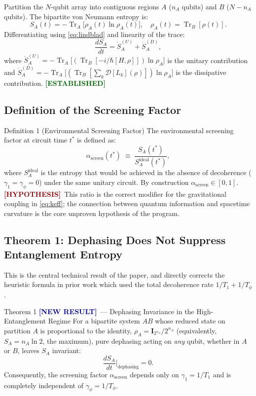 \documentclass[12pt,a4paper]{article}
\newcommand{\EST}{\textcolor{darkgreen}{\textbf{[ESTABLISHED]}}}
\newcommand{\HYP}{\textcolor{darkred}{\textbf{[HYPOTHESIS]}}}
\newcommand{\NEW}{\textcolor{darkblue}{\textbf{[NEW RESULT]}}}
\theoremstyle{monette}
\theoremstyle{definition}
\newcommand{\SA}{S_A}
\newcommand{\asc}{\alpha_{\mathrm{screen}}}
\newcommand{\gamone}{\gamma_1}
\newcommand{\gamphi}{\gamma_\phi}
\newcommand{\Tone}{T_1}
\newcommand{\Tphi}{T_\phi}
\newcommand{\rhored}{\rho_A}
\newcommand{\Diss}{\mathcal{D}}
\renewcommand{\Tr}{\operatorname{Tr}}
\begin{document}
Partition the $N$-qubit array into contiguous regions $A$ ($n_A$ qubits)
and $B$ ($N-n_A$ qubits). The bipartite von Neumann entropy is:
\begin{equation}
  \SA(t) = -\Tr_A\bigl[\rhored(t)\ln\rhored(t)\bigr],
  \quad \rhored(t) = \Tr_B[\rho(t)].
  \label{eq:SA_def}
\end{equation}
Differentiating using \cref{eq:lindblad} and linearity of the trace:
\begin{equation}
  \frac{d\SA}{dt} = \dot{S}_A^{(U)} + \dot{S}_A^{(D)},
  \label{eq:SA_decomp}
\end{equation}
where $\dot{S}_A^{(U)} = -\Tr_A\bigl[(\Tr_B[-i/\hbar[H,\rho]])\ln\rhored\bigr]$
is the unitary contribution and
$\dot{S}_A^{(D)} = -\Tr_A\bigl[(\Tr_B[\sum_k \Diss[L_k](\rho)])\ln\rhored\bigr]$
is the dissipative contribution. \EST

\subsection{Definition of the Screening Factor}
\label{sec:alpha_def}

\begin{defbox}{Definition 1 (Environmental Screening Factor)}
The environmental screening factor at circuit time $t^*$ is defined as:
\begin{equation}
  \asc(t^*) \;\equiv\; \frac{\SA(t^*)}{\SA^{\mathrm{ideal}}(t^*)},
  \label{eq:alpha_def}
\end{equation}
where $\SA^{\mathrm{ideal}}$ is the entropy that would be achieved in the
absence of decoherence ($\gamone = \gamphi = 0$) under the same unitary
circuit. By construction $\asc \in [0,1]$.
\HYP\ This ratio is the correct modifier for the gravitational coupling
in \cref{eq:keff}; the connection between quantum information and spacetime
curvature is the core unproven hypothesis of the program.
\end{defbox}

\subsection{Theorem 1: Dephasing Does Not Suppress Entanglement Entropy}
\label{sec:theorem1}

This is the central technical result of the paper, and directly corrects the
heuristic formula in prior work which used the total decoherence rate
$1/\Tone + 1/\Tphi$.

\begin{thmbox}{Theorem 1 \NEW\ --- Dephasing Invariance in the High-Entanglement Regime}
For a bipartite system $AB$ whose reduced state on partition $A$ is
proportional to the identity, $\rhored = \mathbf{I}_{2^{n_A}}/2^{n_A}$
(equivalently, $\SA = n_A\ln 2$, the maximum), pure dephasing
acting on \emph{any} qubit, whether in $A$ or $B$, leaves $\SA$ invariant:
\begin{equation}
  \frac{d\SA}{dt}\Bigg|_{\mathrm{dephasing}} = 0.
  \label{eq:theorem1}
\end{equation}
Consequently, the screening factor $\asc$ depends only on $\gamone = 1/\Tone$
and is completely independent of $\gamphi = 1/\Tphi$.
\end{thmbox}
\end{document}

